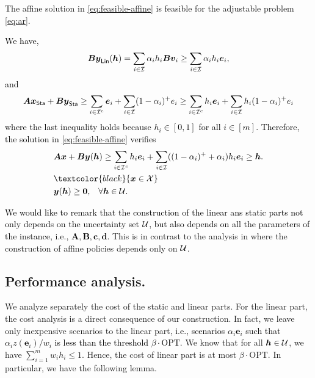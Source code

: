 \documentclass[moor]{informs1}              %
\newcommand{\opt}{\mathrm{OPT}}
\newcommand{\mb}[1]{\ensuremath{\boldsymbol{#1}}}
\newcommand*{\red}{\textcolor{black}}
\begin{document}
\begin{lemma} \label{lem:feasibilty}
The affine solution in \eqref{eq:feasible-affine}  is feasible for the adjustable problem \eqref{eq:ar}.  
\end{lemma}
\red{
We have, 
$$ \mb B  \mb y_{\sf Lin}( \mb h )  =  \sum_{i \in {\cal I}} \alpha_i h_i \mb B {\mb v}_i  \geq \sum_{i \in {\cal I}} \alpha_i h_i \mb e_i,$$ 
and
$$ \mb A \mb x_{\sf Sta} + \mb B \mb y_{\sf Sta}  \geq   \sum_{ i \in {\cal I}^c} \mb e_i     + \sum_{ i \in {\cal I}}  (1-\alpha_i)^+ e_i
\geq   \sum_{ i \in {\cal I}^c} h_i \mb e_i     + \sum_{ i \in {\cal I}}  h_i (1-\alpha_i)^+ e_i $$
 where the last inequality holds because $ h_i \in [0,1]$ for all $i \in [m]$.
Therefore, the solution in \eqref{eq:feasible-affine} verifies
\begin{align*}
&\mb A \mb x + \mb B \mb y( \mb h )  \geq \sum_{i \in {\cal I}^c} h_i \mb e_i+    \sum_{i \in {\cal I}}     ((1-\alpha_i)^+ + \alpha_i)               h_i \mb e_i  \geq \mb h. \\
  & \red{\mb{x}  \in  {\cal X} }\\
& \mb{y}(\mb{h}) \geq \mb 0, \;  \; \; \forall \mb h \in {\cal U}.
\end{align*}
 }
\hfill
\Halmos
\endproof

\red{ We would like to remark that the construction of the linear ans static parts  not only depends on the uncertainty set ${\cal U}$, but also depends
on all the parameters of the instance, i.e., $\mb A, \mb B, \mb c, \mb d$.}  This is in contrast to the analysis in \cite{BG10} where the construction of affine policies depends only on $\cal U$.

 
\subsection{Performance analysis.}
 We analyze separately the cost of the static and linear parts. For the linear part, the cost analysis is a direct consequence of our construction. In fact, we leave only  inexpensive scenarios to the linear part, \red{ i.e., scenarios $\alpha_i \mb e_i$ such that $\alpha_i z(\mb e_i)/w_i$ is less than the threshold $\beta \cdot \opt$.} We know that for all $\mb h \in {\cal U}$, we have
$\sum_{i=1}^m w_i h_i \leq 1$. Hence, the cost of linear part is at most $\beta \cdot \opt$. In particular, we have the following lemma.

\end{document}

